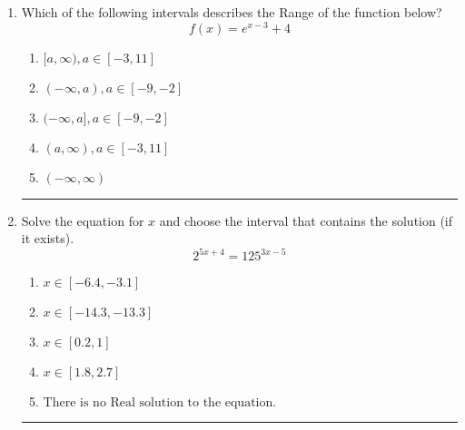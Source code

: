 \documentclass[14pt]{extbook}
\newcommand{\litem}[1]{\item#1\hspace*{-1cm}\rule{\textwidth}{0.4pt}}
\begin{document}
\begin{enumerate}
{\begin{enumerate}[label=\Alph*.]
\end{enumerate} }
\litem{
Which of the following intervals describes the Range of the function below?\[ f(x) = e^{x-3}+4 \]\begin{enumerate}[label=\Alph*.]
\item \( [a, \infty), a \in [-3, 11] \)
\item \( (-\infty, a), a \in [-9, -2] \)
\item \( (-\infty, a], a \in [-9, -2] \)
\item \( (a, \infty), a \in [-3, 11] \)
\item \( (-\infty, \infty) \)

\end{enumerate} }
\litem{
Solve the equation for $x$ and choose the interval that contains the solution (if it exists).\[ 2^{5x+4} = 125^{3x-5} \]\begin{enumerate}[label=\Alph*.]
\item \( x \in [-6.4, -3.1] \)
\item \( x \in [-14.3, -13.3] \)
\item \( x \in [0.2, 1] \)
\item \( x \in [1.8, 2.7] \)
\item \( \text{There is no Real solution to the equation.} \)

\end{enumerate} }
\end{enumerate}
\end{document}
